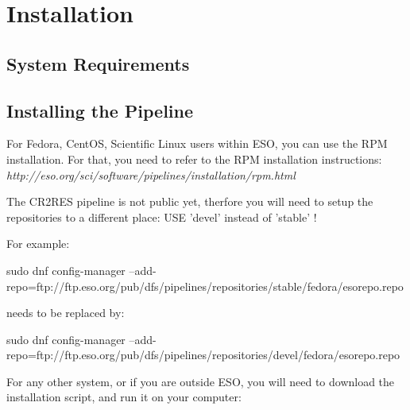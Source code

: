 \section{Installation}
\label{sec:installation}


\subsection{System Requirements}
\label{sec:platforms}

\subsection{Installing the \instrument{} Pipeline}
\label{sec:install-howto}

For Fedora, CentOS, Scientific Linux users within ESO, you can use the RPM installation.
For that, you need to refer to the RPM installation instructions:
{\it http://eso.org/sci/software/pipelines/installation/rpm.html}

The CR2RES pipeline is not public yet, therfore you will need to setup the repositories to a different place: 
USE 'devel' instead of 'stable' ! 

For example:

sudo dnf config-manager --add-repo=ftp://ftp.eso.org/pub/dfs/pipelines/repositories/stable/fedora/esorepo.repo

needs to be replaced by:

sudo dnf config-manager --add-repo=ftp://ftp.eso.org/pub/dfs/pipelines/repositories/devel/fedora/esorepo.repo


For any other system, or if you are outside ESO, you will need to download the installation script, and run it on your computer:

